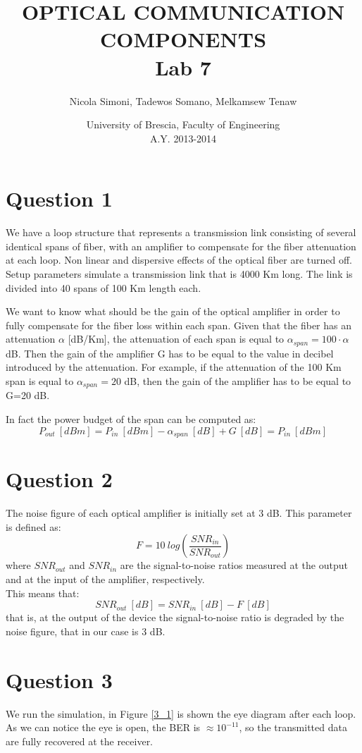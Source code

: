 \documentclass[a4paper,10pt]{report}
\title{\textbf{OPTICAL COMMUNICATION COMPONENTS \\ Lab 7}}
\author{Nicola Simoni, Tadewos Somano, Melkamsew Tenaw}
\date{University of Brescia, Faculty of Engineering\\A.Y. 2013-2014}
\begin{document}
\maketitle


\section*{Question 1}
We have a loop structure that represents a transmission link consisting of several identical spans of fiber, with an
amplifier to compensate for the fiber attenuation at each loop.
Non linear and dispersive effects of the optical fiber are turned off. Setup parameters simulate a transmission link
that is 4000 Km long. The link is divided into 40 spans of 100 Km length each.

We want to know what should be the gain of the optical amplifier in order to fully compensate for the fiber loss
within each span.
Given that the fiber has an attenuation $\alpha$ [dB/Km], the attenuation of each span is equal to
$\alpha_{span}=100 \cdot \alpha$ dB. Then the gain of the amplifier G has to be equal to the value in decibel introduced
by the attenuation. For example, if the attenuation of the 100 Km span is equal to $\alpha_{span}=20$ dB,
then the gain of the amplifier has to be equal to G=20 dB.

In fact the power budget of the span can be computed as:
$$P_{out} \ [dBm]=P_{in} \ [dBm]-\alpha_{span} \ [dB]+G \ [dB]=P_{in} \ [dBm]$$

\section*{Question 2}
The noise figure of each optical amplifier is initially set at 3 dB.
This parameter is defined as: $$F=10 \ log \left( \frac{SNR_{in}}{SNR_{out}} \right)$$
where $SNR_{out}$ and $SNR_{in}$ are the signal-to-noise ratios measured at the output and at the input of the amplifier, respectively.
\\This means that: $$SNR_{out} \ [dB]=SNR_{in} \ [dB]-F \ [dB]$$
that is, at the output of the device the signal-to-noise ratio is degraded by the noise figure, that in our case is 3 dB.

\section*{Question 3}
We run the simulation, in Figure \ref{3_1} is shown the eye diagram after each loop. As we can notice the eye is open, the BER is
$\approx 10^{-11}$, so the transmitted data are fully recovered at the receiver.
\end{document}
